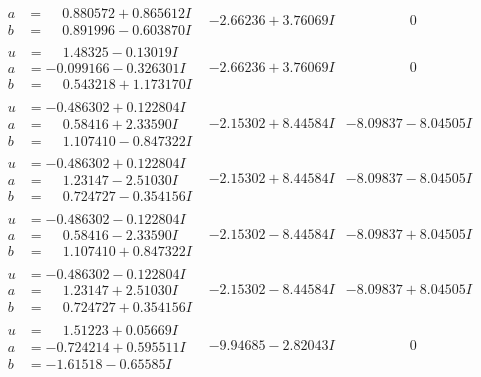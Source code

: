 \documentclass[1p]{elsarticle_modified}
\theoremstyle{definition}
\begin{document}
$$\begin{array}{c|c|c}
\begin{aligned}
a &= \phantom{-}0.880572 + 0.865612 I \\
b &= \phantom{-}0.891996 - 0.603870 I\end{aligned}
 & -2.66236 + 3.76069 I & \phantom{-0.000000 } 0 \\ \hline\begin{aligned}
u &= \phantom{-}1.48325 - 0.13019 I \\
a &= -0.099166 - 0.326301 I \\
b &= \phantom{-}0.543218 + 1.173170 I\end{aligned}
 & -2.66236 + 3.76069 I & \phantom{-0.000000 } 0 \\ \hline\begin{aligned}
u &= -0.486302 + 0.122804 I \\
a &= \phantom{-}0.58416 + 2.33590 I \\
b &= \phantom{-}1.107410 - 0.847322 I\end{aligned}
 & -2.15302 + 8.44584 I & -8.09837 - 8.04505 I \\ \hline\begin{aligned}
u &= -0.486302 + 0.122804 I \\
a &= \phantom{-}1.23147 - 2.51030 I \\
b &= \phantom{-}0.724727 - 0.354156 I\end{aligned}
 & -2.15302 + 8.44584 I & -8.09837 - 8.04505 I \\ \hline\begin{aligned}
u &= -0.486302 - 0.122804 I \\
a &= \phantom{-}0.58416 - 2.33590 I \\
b &= \phantom{-}1.107410 + 0.847322 I\end{aligned}
 & -2.15302 - 8.44584 I & -8.09837 + 8.04505 I \\ \hline\begin{aligned}
u &= -0.486302 - 0.122804 I \\
a &= \phantom{-}1.23147 + 2.51030 I \\
b &= \phantom{-}0.724727 + 0.354156 I\end{aligned}
 & -2.15302 - 8.44584 I & -8.09837 + 8.04505 I \\ \hline\begin{aligned}
u &= \phantom{-}1.51223 + 0.05669 I \\
a &= -0.724214 + 0.595511 I \\
b &= -1.61518 - 0.65585 I\end{aligned}
 & -9.94685 - 2.82043 I & \phantom{-0.000000 } 0 \\ \hline\begin{aligned}

\end{aligned}
\end{array}$$
\end{document}
